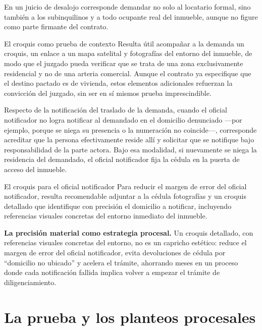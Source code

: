 \documentclass[12pt,oneside]{book}
\begin{document}
En un juicio de desalojo corresponde demandar no solo al locatario formal, sino también a los subinquilinos y a todo ocupante real del inmueble, aunque no figure como parte firmante del contrato.

\begin{example}{El croquis como prueba de contexto}
Resulta útil acompañar a la demanda un croquis, un enlace a un mapa satelital y fotografías del entorno del inmueble, de modo que el juzgado pueda verificar que se trata de una zona exclusivamente residencial y no de una arteria comercial. Aunque el contrato ya especifique que el destino pactado es de vivienda, estos elementos adicionales refuerzan la convicción del juzgado, sin ser en sí mismos prueba imprescindible.
\end{example}

Respecto de la notificación del traslado de la demanda, cuando el oficial notificador no logra notificar al demandado en el domicilio denunciado —por ejemplo, porque se niega su presencia o la numeración no coincide—, corresponde acreditar que la persona efectivamente reside allí y solicitar que se notifique bajo responsabilidad de la parte actora. Bajo esa modalidad, si nuevamente se niega la residencia del demandado, el oficial notificador fija la cédula en la puerta de acceso del inmueble.

\begin{example}{El croquis para el oficial notificador}
Para reducir el margen de error del oficial notificador, resulta recomendable adjuntar a la cédula fotografías y un croquis detallado que identifique con precisión el domicilio a notificar, incluyendo referencias visuales concretas del entorno inmediato del inmueble.
\end{example}

\begin{important}
\textbf{La precisión material como estrategia procesal.} Un croquis detallado, con referencias visuales concretas del entorno, no es un capricho estético: reduce el margen de error del oficial notificador, evita devoluciones de cédula por ``domicilio no ubicado'' y acelera el trámite, ahorrando meses en un proceso donde cada notificación fallida implica volver a empezar el trámite de diligenciamiento.
\end{important}

\chapter{La prueba y los planteos procesales}
\end{document}
